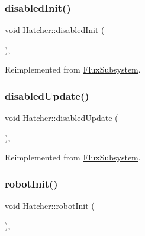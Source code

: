 \mbox{\label{classHatcher_a2e61639f734ec3a5627b655695bbadf1}} 
\subsubsection{\texorpdfstring{disabled\+Init()}{disabledInit()}}
{\footnotesize\ttfamily void Hatcher\+::disabled\+Init (\begin{DoxyParamCaption}{ }\end{DoxyParamCaption})\hspace{0.3cm}{\ttfamily [override]}, {\ttfamily [virtual]}}



Reimplemented from \hyperlink{classFluxSubsystem_aa0b8fde8aa5094627d15d24e545e1da4}{Flux\+Subsystem}.

\mbox{\label{classHatcher_ab6bb222ab940507490f2009f3113bc41}} 
\subsubsection{\texorpdfstring{disabled\+Update()}{disabledUpdate()}}
{\footnotesize\ttfamily void Hatcher\+::disabled\+Update (\begin{DoxyParamCaption}{ }\end{DoxyParamCaption})\hspace{0.3cm}{\ttfamily [override]}, {\ttfamily [virtual]}}



Reimplemented from \hyperlink{classFluxSubsystem_a5c39cb0f0834cc77a2b8f4f47778da87}{Flux\+Subsystem}.

\mbox{\label{classHatcher_ae917b572274b45c8e695cd8e285a5d70}} 
\subsubsection{\texorpdfstring{robot\+Init()}{robotInit()}}
{\footnotesize\ttfamily void Hatcher\+::robot\+Init (\begin{DoxyParamCaption}{ }\end{DoxyParamCaption})\hspace{0.3cm}{\ttfamily [override]}, {\ttfamily [virtual]}}



